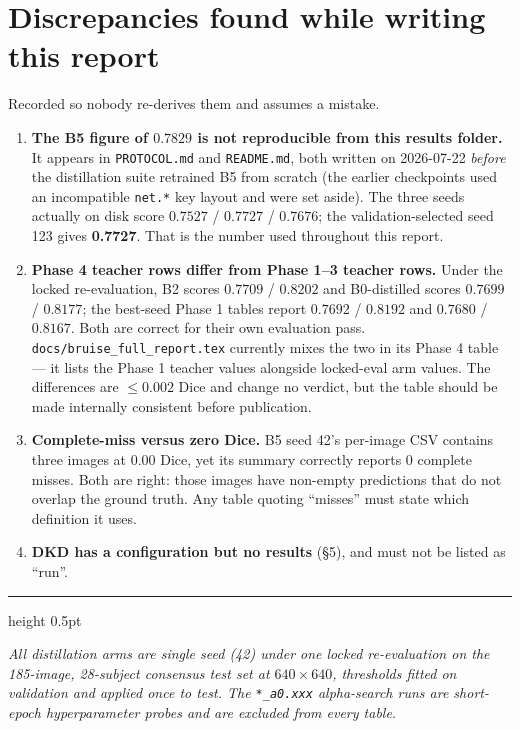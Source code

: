\documentclass[11pt]{article}
\begin{document}
\section{Discrepancies found while writing this report}
\label{sec:discrep}

Recorded so nobody re-derives them and assumes a mistake.

\begin{enumerate}[leftmargin=1.7em,itemsep=4pt]
  \item \textbf{The B5 figure of $0.7829$ is not reproducible from this results folder.} It
  appears in \texttt{PROTOCOL.md} and \texttt{README.md}, both written on 2026-07-22
  \emph{before} the distillation suite retrained B5 from scratch (the earlier checkpoints used an
  incompatible \texttt{net.*} key layout and were set aside). The three seeds actually on disk
  score $0.7527$ / $0.7727$ / $0.7676$; the validation-selected seed 123 gives \textbf{0.7727}.
  That is the number used throughout this report.

  \item \textbf{Phase 4 teacher rows differ from Phase 1--3 teacher rows.} Under the locked
  re-evaluation, B2 scores $0.7709$ / $0.8202$ and B0-distilled scores $0.7699$ / $0.8177$; the
  best-seed Phase 1 tables report $0.7692$ / $0.8192$ and $0.7680$ / $0.8167$. Both are correct
  for their own evaluation pass. \texttt{docs/bruise\_full\_report.tex} currently mixes the two in
  its Phase 4 table --- it lists the Phase 1 teacher values alongside locked-eval arm values. The
  differences are $\le 0.002$ Dice and change no verdict, but the table should be made internally
  consistent before publication.

  \item \textbf{Complete-miss versus zero Dice.} B5 seed 42's per-image CSV contains three images
  at $0.00$ Dice, yet its summary correctly reports $0$ complete misses. Both are right: those
  images have non-empty predictions that do not overlap the ground truth. Any table quoting
  ``misses'' must state which definition it uses.

  \item \textbf{DKD has a configuration but no results} (\S5), and must not be listed as ``run''.
\end{enumerate}

\vspace{8pt}
{\color{rulegray}\hrule height 0.5pt}
\vspace{4pt}

\begin{center}\footnotesize\itshape
All distillation arms are single seed (42) under one locked re-evaluation on the 185-image,
28-subject consensus test set at $640\times640$, thresholds fitted on validation and applied once
to test. The \texttt{*\_a0.xxx} alpha-search runs are short-epoch hyperparameter probes and are
excluded from every table.
\end{center}
\end{document}
